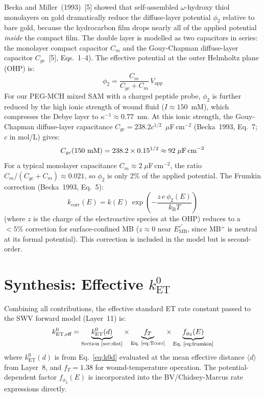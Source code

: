 \documentclass[10pt,a4paper]{article}
\numberwithin{equation}{section}
\newcommand{\kET}{k_{\text{ET}}^{0}}
\newcommand{\cit}[1]{[#1]}
\newcommand{\Eo}{E^{\circ\prime}}
\newcommand{\kB}{k_{\text{B}}}
\begin{document}
Becka and Miller~(1993)~\cit{5} showed that self-assembled
$\omega$-hydroxy thiol monolayers on gold dramatically reduce the
diffuse-layer potential $\phi_2$ relative to bare gold, because the
hydrocarbon film drops nearly all of the applied potential
\textit{inside} the compact film. The double layer is modelled as
two capacitors in series: the monolayer compact capacitor $C_m$ and
the Gouy-Chapman diffuse-layer capacitor $C_{gc}$~\cit{5},
Eqs.~1--4). The effective potential at the outer Helmholtz plane
(OHP) is:
\begin{equation}
  \phi_2 = \frac{C_m}{C_{gc} + C_m}\,V_{\text{app}}
  \label{eq:phi2}
\end{equation}
For our PEG-MCH mixed SAM with a charged peptide probe, $\phi_2$ is
further reduced by the high ionic strength of wound fluid
($I \approx 150$~mM), which compresses the Debye layer to
$\kappa^{-1} \approx 0.77$~nm. At this ionic strength, the Gouy-Chapman
diffuse-layer capacitance $C_{gc} = 238.2 c^{1/2}$~$\mu$F\,cm$^{-2}$
(Becka~1993, Eq.~7; $c$ in mol/L) gives:
\begin{equation}
  C_{gc}(\text{150 mM}) = 238.2 \times 0.15^{1/2}
  \approx 92\;\mu\text{F\,cm}^{-2}
  \label{eq:Cgc}
\end{equation}
For a typical monolayer capacitance $C_m \approx 2\;\mu$F\,cm$^{-2}$,
the ratio $C_m/(C_{gc} + C_m) \approx 0.021$, so $\phi_2$ is only 2\%
of the applied potential. The Frumkin correction (Becka~1993, Eq.~5):
\begin{equation}
  k_{\text{corr}}(E) = k(E)\,\exp\!\left(-\frac{z\,e\,\phi_2(E)}{\kB T}\right)
  \label{eq:frumkin}
\end{equation}
(where $z$ is the charge of the electroactive species at the OHP)
reduces to a $< 5\%$ correction for surface-confined MB ($z \approx 0$
near $\Eo_{\text{MB}}$, since MB$^+$ is neutral at its formal
potential). This correction is included in the model but is
second-order.

\section{Synthesis: Effective $k_{\text{ET}}^0$}
\label{sec:synth}

Combining all contributions, the effective standard ET rate constant
passed to the SWV forward model (Layer~11) is:
\begin{equation}
  k^{0}_{\text{ET,eff}} = \underbrace{\kET(d)}_{\text{Section~\ref{sec:dist}}}
  \times \underbrace{f_T}_{\text{Eq.~\ref{eq:Tcorr}}}
  \times \underbrace{f_{\phi_2}(E)}_{\text{Eq.~\ref{eq:frumkin}}}
  \label{eq:kETeff}
\end{equation}
where $\kET(d)$ is from Eq.~\eqref{eq:k0d} evaluated at the
mean effective distance $\langle d\rangle$ from Layer~8, and
$f_T = 1.38$ for wound-temperature operation. The potential-dependent
factor $f_{\phi_2}(E)$ is incorporated into the BV/Chidsey-Marcus
rate expressions directly.
\end{document}
